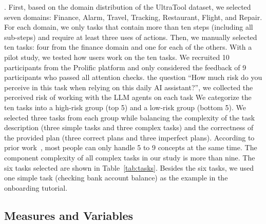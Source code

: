 . First, based on the domain distribution of the UltraTool dataset, we selected seven domains: Finance, Alarm, Travel, Tracking, Restaurant, Flight, and Repair. 
For each domain, we only  tasks that contain more than ten steps (including all sub-steps) and require at least three uses of actions. 
Then, we manually selected ten tasks: four from the finance domain and one for each of the others. 
With a pilot study, we tested how users work on the ten tasks. 
We recruited 10 participants from the Prolific platform and only considered the feedback of 9 participants who passed all attention checks. 
 the question “How much risk do you perceive in this task when relying on this daily AI assistant?”, we collected the perceived risk of working with the LLM agents on each task  %
We categorize the ten tasks into a high-risk group (top 5) and a low-risk group (bottom 5). 
We selected three tasks from each group while balancing the complexity of the task description (three simple tasks and three complex tasks) and the correctness of the provided plan (three correct plans and three imperfect plans). 
According to prior work~\cite{miller1956magical}, most people can only handle 5 to 9 concepts at the same time. 
The component complexity of all complex tasks in our study is more than nine.
The six tasks selected are shown in Table~\ref{tab:tasks}. 
Besides the six tasks, we used one simple task (\ie checking bank account balance) as the example in the onboarding tutorial.


\subsection{Measures and Variables}
\label{sec-measure}

